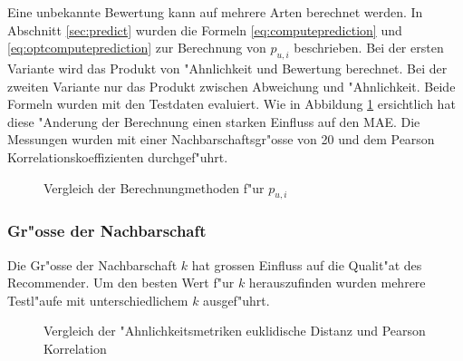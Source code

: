 \documentclass[a4paper, 12pt]{article}
\begin{document}
Eine unbekannte Bewertung kann auf mehrere Arten berechnet werden. In Abschnitt \ref{sec:predict} wurden die Formeln \ref{eq:computeprediction} und \ref{eq:optcomputeprediction} zur Berechnung  von $p_{u,i}$ beschrieben. Bei der ersten Variante wird das Produkt von "Ahnlichkeit und Bewertung berechnet. Bei der zweiten Variante nur das Produkt zwischen Abweichung und "Ahnlichkeit. Beide Formeln wurden mit den Testdaten evaluiert. Wie in Abbildung \ref{fig:predicteq} ersichtlich hat diese "Anderung der Berechnung einen starken Einfluss auf den MAE. Die Messungen wurden mit einer Nachbarschaftsgr"osse von 20 und dem Pearson Korrelationskoeffizienten durchgef"uhrt.

\begin{figure}
\centering
\label{fig:predicteq}
\caption{Vergleich der Berechnungmethoden f"ur $p_{u,i}$}
\end{figure}

\subsubsection{Gr"osse der Nachbarschaft}
\label{sec:neighborhoodsize}

Die Gr"osse der Nachbarschaft $k$ hat grossen Einfluss auf die Qualit"at des Recommender. Um den besten Wert f"ur $k$ herauszufinden wurden mehrere Testl"aufe mit unterschiedlichem $k$ ausgef"uhrt.

\begin{figure}
  \centering
{}
\label{fig:nrofneighbors}
\caption{Vergleich der "Ahnlichkeitsmetriken euklidische Distanz und Pearson Korrelation}
\end{figure}
\end{document}
